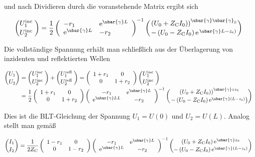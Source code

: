 und nach Dividieren durch die voranstehende Matrix ergibt sich

\begin{equation}
	\binom{U_{1}^{\text {inc }}}{U_{2}^{\text {inc }}}=\frac{1}{2}\left(\begin{array}{ll}
		-r_{1} & \mathrm{e}^{\ubar{\gamma} L}  \\
		\mathrm{e}^{\ubar{\gamma} L} & -r_{2}
	\end{array}\right)^{-1}\binom{\left.\left(U_{0}+Z_{\mathrm{C}} I_{0}\right)\right)^{\ubar{\gamma} \ubar{\gamma}_{\mathrm{S}}}}{-\left(U_{0}-Z_{\mathrm{C}} I_{0}\right) \mathrm{e}^{\left.\ubar{\gamma} L-z_{\mathrm{s}}\right)}}
\end{equation}

Die vollständige Spannung erhält man schließlich aus der Überlagerung von inzidenten und reflektierten Wellen


\begin{align}
	\binom{U_{1}}{U_{2}} & =\binom{U_{1}^{\text {inc }}}{U_{2}^{\text {inc }}}+\binom{U_{1}^{\text {refl }}}{U_{2}^{\text {refl }}}=\left(\begin{array}{cc}
		1+r_{1} & 0 \\
		0 & 1+r_{2}
	\end{array}\right)\binom{U_{1}^{\text {inc }}}{U_{2}^{\text {inc }}}  \\
	& =\frac{1}{2}\left(\begin{array}{cc}
		1+r_{1} & 0 \\
		0 & 1+r_{2}
	\end{array}\right)\left(\begin{array}{cc}
		-r_{1} & \mathrm{e}^{\ubar{\gamma} L} \\
		\mathrm{e}^{\ubar{\gamma} L L} & -r_{2}
	\end{array}\right)^{-1}\binom{\left.\left(U_{0}+Z_{\mathrm{C}} I_{0}\right)\right)^{\ubar{\gamma} z z_{\mathrm{S}}}}{\left.-\left(U_{0}-Z_{\mathrm{C}} I_{0}\right) \mathrm{e}^{\ubar{\gamma}\left(L-z_{\mathrm{s}}\right)}\right)} 
\end{align}


Dies ist die BLT-Gleichung der Spannung $U_{1}=U(0)$ und $U_{2}=U(L)$. Analog stellt man gemäß

\begin{equation}
	\binom{I_{1}}{I_{2}}=\frac{1}{2 Z_{\mathrm{C}}}\left(\begin{array}{cc}
		1-r_{1} & 0  \\
		0 & 1-r_{2}
	\end{array}\right)\left(\begin{array}{cc}
		-r_{1} & \mathrm{e}^{\ubar{\gamma} L} \\
		\mathrm{e}^{\ubar{\gamma} L} & -r_{2}
	\end{array}\right)^{-1}\binom{\left(U_{0}+Z_{\mathrm{C}} I_{0}\right) \mathrm{e}^{\ubar{\gamma} z_{\mathrm{S}}}}{-\left(U_{0}-Z_{\mathrm{C}} I_{0}\right) \mathrm{e}^{\ubar{\gamma}\left(L-z_{\mathrm{s}}\right)}}
\end{equation}


